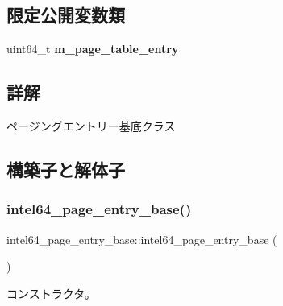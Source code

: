 \subsection*{限定公開変数類}
\begin{DoxyCompactItemize}
\item 
\hypertarget{classintel64__page__entry__base_aeee035802da3fec6c99576bbaa76e9a0}{}\label{classintel64__page__entry__base_aeee035802da3fec6c99576bbaa76e9a0} 
uint64\+\_\+t {\bfseries m\+\_\+page\+\_\+table\+\_\+entry}
\end{DoxyCompactItemize}


\subsection{詳解}
ページングエントリー基底クラス 

\subsection{構築子と解体子}
\hypertarget{classintel64__page__entry__base_aa4b07325975b107d7a39065d3c7f3f70}{}\label{classintel64__page__entry__base_aa4b07325975b107d7a39065d3c7f3f70} 
\subsubsection{\texorpdfstring{intel64\+\_\+page\+\_\+entry\+\_\+base()}{intel64\_page\_entry\_base()}\hspace{0.1cm}{\footnotesize\ttfamily [1/3]}}
{\footnotesize\ttfamily intel64\+\_\+page\+\_\+entry\+\_\+base\+::intel64\+\_\+page\+\_\+entry\+\_\+base (\begin{DoxyParamCaption}{ }\end{DoxyParamCaption})}

コンストラクタ。 \hypertarget{classintel64__page__entry__base_aeea4d63f52154f203bf6a3a834eddb6d}{}\label{classintel64__page__entry__base_aeea4d63f52154f203bf6a3a834eddb6d} 
